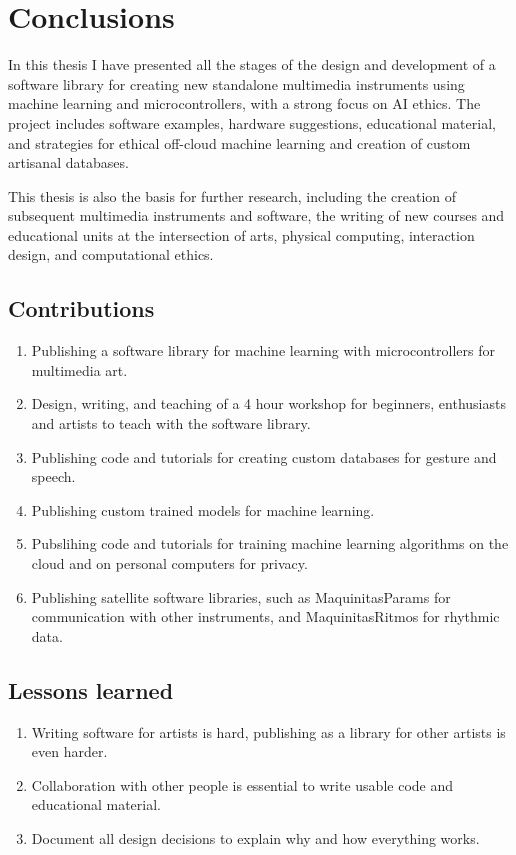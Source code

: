 \chapter{Conclusions}

In this thesis I have presented all the stages of the design and development of a software library for creating new standalone multimedia instruments using machine learning and microcontrollers, with a strong focus on AI ethics. The project includes software examples, hardware suggestions, educational material, and strategies for ethical off-cloud machine learning and creation of custom artisanal databases.

This thesis is also the basis for further research, including the creation of subsequent multimedia instruments and software, the writing of new courses and educational units at the intersection of arts, physical computing, interaction design, and computational ethics.

\section{Contributions}

\begin{enumerate}
  \item Publishing a software library for machine learning with microcontrollers for multimedia art.
  \item Design, writing, and teaching of a 4 hour workshop for beginners, enthusiasts and artists to teach with the software library.
  \item Publishing code and tutorials for creating custom databases for gesture and speech.
  \item Publishing custom trained models for machine learning.
  \item Pubslihing code and tutorials for training machine learning algorithms on the cloud and on personal computers for privacy.
  \item Publishing satellite software libraries, such as MaquinitasParams for communication with other instruments, and MaquinitasRitmos for rhythmic data.
\end{enumerate}

\section{Lessons learned}

\begin{enumerate}
  \item Writing software for artists is hard, publishing as a library for other artists is even harder.
  \item Collaboration with other people is essential to write usable code and educational material.
  \item Document all design decisions to explain why and how everything works.
\end{enumerate}

